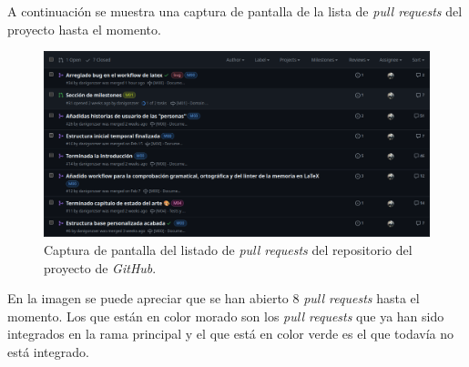 A continuación se muestra una captura de pantalla de la lista de \textit{pull requests} del proyecto hasta el momento.

\begin{figure}[H]
    \caption{Captura de pantalla del listado de \textit{pull requests} del repositorio del proyecto de \textit{GitHub}.}
    \centering
    \vspace*{0.5cm}
    \includegraphics[scale=0.2]{figuras/listado_pull_requests_github.png}
\end{figure}

En la imagen se puede apreciar que se han abierto 8 \textit{pull requests} hasta el momento. Los que están en color morado son los \textit{pull requests} que ya han sido integrados en la rama principal y el que está en color verde es el que todavía no está integrado.

